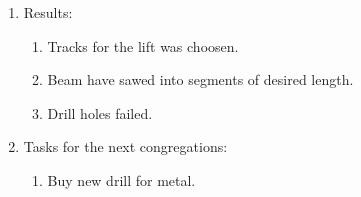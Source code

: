 \begin{enumerate}
\begin{enumerate}
\begin{enumerate}
      \end{enumerate}
      
    \end{enumerate}
    
	\item Results:
	\begin{enumerate}
	  \item Tracks for the lift was choosen.
	  
	  \item Beam have sawed into segments of desired length.
	  
	  \item Drill holes failed.
	   
    \end{enumerate}
    
	\item Tasks for the next congregations:
	\begin{enumerate}
	  \item Buy new drill for metal.
	  
    \end{enumerate}     
\end{enumerate}
\fillpage
